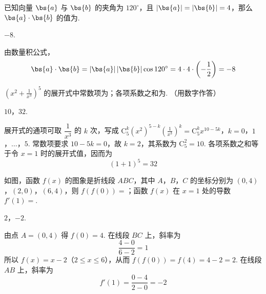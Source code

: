 \begin{problem}
已知向量 \(\bs{a}\) 与 \(\bs{b}\) 的夹角为 \(120^{\circ}\)，且 \(|\bs{a}| = |\bs{b}| = 4\)，那么 \(\bs{a} \cdot \bs{b}\) 的值为\fillinblank{}.
\end{problem}

\begin{answer}
\(-8\).
\end{answer}

\begin{solution}
由数量积公式，
\[
\bs{a}\cdot\bs{b}=|\bs{a}|\,|\bs{b}|\cos120^{\circ}
 =4\cdot4\cdot\left(-\frac12\right)=-8
\]
\end{solution}

\begin{problem}
\(\left(x^{2} + \frac{1}{x^{3}}\right)^{5}\) 的展开式中常数项为\fillinblank{}；各项系数之和为\fillinblank{}. （用数字作答）
\end{problem}

\begin{answer}
\(10\)，\(32\).
\end{answer}

\begin{solution}
展开式的通项可取 \(\dfrac1{x^3}\) 的 \(k\) 次，写成
\(\mathrm C_5^k(x^2)^{5-k}\left(\frac1{x^3}\right)^k =\mathrm C_5^k x^{10-5k}\)，\(k=0\)，\(1\)，\(\ldots\)，\(5\).
常数项要求 \(10-5k=0\)，故 \(k=2\)，其系数为
\(\mathrm C_5^2=10\). 各项系数之和等于令 \(x=1\) 时的展开式值，因而为
\[
\left(1+1\right)^5=32
\]
\end{solution}

\begin{problem}
如图，函数 \( f(x) \) 的图象是折线段 \(ABC\)，其中 \(A\)，\(B\)，\(C\) 的坐标分别为 \((0,4)\)，\((2,0)\)，\((6,4)\)，则 \( f(f(0)) = \)\fillinblank{}；函数 \( f(x) \) 在 \( x = 1 \) 处的导数 \( f'(1) = \)\fillinblank{}.

\end{problem}

\begin{answer}
\(2\)，\(-2\).
\end{answer}

\begin{solution}
由点 \(A=(0,4)\) 得 \(f(0)=4\). 在线段 \(BC\) 上，斜率为
\[
\frac{4-0}{6-2}=1
\]
所以 \(f(x)=x-2\)（\(2\leqslant x\leqslant6\)），从而
\(f(f(0))=f(4)=4-2=2\). 在线段 \(AB\) 上，斜率为
\[
f'(1)=\frac{0-4}{2-0}=-2
\]
\end{solution}

